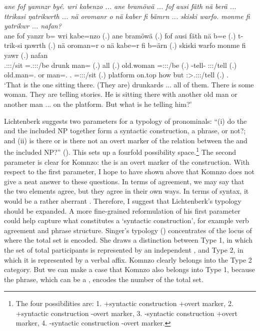 \begin{exe}
	\ex \emph{ane fof yamnzr byé. wri kabenzo ... ane bramöwä ... fof ausi fäth nä berä ... ttrikasi ŋatrikwrth ... nä oromanr o nä kaber fi bämrn ... skiski warfo. monme fi yatrikwr ... nafan?}\\
	\gll ane fof yanzr b= wri kabe=nzo (.) ane bramöwä (.) fof ausi fäth nä b=e (.) t-trik-si ŋawrth (.) nä {oroman=r} o nä kabe=r fi b=ärn (.) skiski warfo monme fi yawr (.) nafan\\
	\Dem{} \Emph{} \Tsg.\Masc:\Sbj:\Nonpast:\Ipfv/sit \Med=\Tsg.\Masc:\Sbj:\Nonpast:\Ipfv/be drunk man=\Only{} (.) \Dem{} all (.) \Emph{} old.woman \Dim{} \Indf{} \Med=\Stpl:\Sbj:\Nonpast:\Ipfv/be (.) \Redup-tell-\Nmlz{} \Stpl:\Sbj:\Nonpast:\Ipfv/tell (.) \Indf{} {old.man=\Assoc.\Du} or \Indf{} man=\Assoc.\Du{} \Third.\Abs{} \Med=\Stdu:\Sbj:\Nonpast:\Ipfv/sit (.) platform on.top how but \Stsg:\Sbj>\Tsg.\Masc:\Io:\Nonpast:\Ipfv/tell (.) \Tsg.\Dat\\
	\trans `That is the one sitting there. (They are) drunkards ... all of them. There is some woman. They are telling stories. He is sitting there with another old man or another man ... on the platform. But what is he telling him?'\\
	\label{ex743}
\end{exe}

Lichtenberk suggests two parameters for a typology of  pronominals: ``(i) do the   and the included NP together form a syntactic construction, a phrase, or not?; and (ii) is there or is there not an overt marker of the relation between the   and the included NP?'' (\citeyear[3]{Lichtenberk:2000hr}). This sets up a fourfold possibility space.\footnote{The four possibilities are: 1. +syntactic construction +overt marker, 2. +syntactic construction -overt marker, 3. -syntactic construction +overt marker, 4. -syntactic construction -overt marker.} The second parameter is clear for Komnzo: the   is an overt marker of the  construction. With respect to the first parameter, I hope to have shown above that Komnzo does not give a neat answer to these questions. In terms of agreement, we may say that the two elements agree, but they agree in their own ways. In terms of  syntax, it would be a rather aberrant . Therefore, I suggest that Lichtenberk's typology should be expanded. A more fine-grained reformulation of his first parameter could help capture what constitutes a `syntactic construction', for example verb agreement and phrase structure. Singer's typology (\citeyear{Singer:inclu}) concentrates of the locus of where the total set is encoded. She draws a distinction between Type 1, in which the set of total participants is represented by an independent , and Type 2, in which it is represented by a verbal affix. Komnzo clearly belongs into the Type 2 category. But we can make a case that Komnzo also belongs into Type 1, because the  phrase, which can be a , encodes the number of the total set.\\

